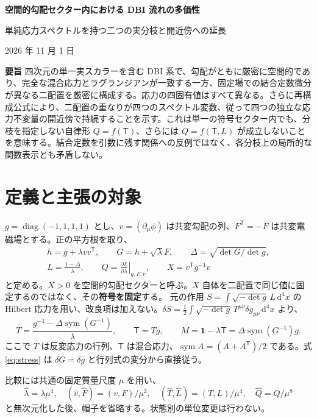 \documentclass[11pt,a4paper]{article}
\newcommand{\sym}{\operatorname{sym}}
\newcommand{\diag}{\operatorname{diag}}
\newcommand{\Id}{\mathbf 1}
\newcommand{\Tmix}{\mathsf T}
\newcommand{\dd}{\mathrm d}
\begin{document}
\begin{center}
{\Large\bfseries 空間的勾配セクター内における DBI 流れの多価性}\par
\vspace{5pt}
{\large 単純応力スペクトルを持つ二つの実分枝と開近傍への延長}\par
\vspace{5pt}
2026 年 11 月 1 日
\end{center}
\noindent\textbf{要旨}\quad
四次元の単一実スカラーを含む DBI 系で、勾配がともに厳密に空間的であり、完全な混合応力とラグランジアンが一致する一方、固定場での結合定数微分が異なる二配置を厳密に構成する。応力の四固有値はすべて異なる。さらに再構成公式により、二配置の重なりが四つのスペクトル変数、従って四つの独立な応力不変量の開近傍で持続することを示す。これは単一の符号セクター内でも、分枝を指定しない自律形 $Q=f(\Tmix)$、さらには $Q=f(\Tmix,L)$ が成立しないことを意味する。結合定数を引数に残す関係への反例ではなく、各分枝上の局所的な関数表示とも矛盾しない。

\section{定義と主張の対象}
$g=\diag(-1,1,1,1)$ とし、$v=(\partial_\mu\phi)$ は共変勾配の列、$F^{\mathsf T}=-F$ は共変電磁場とする。正の平方根を取り、
\begin{equation}\label{eq:def}
\begin{gathered}
h=g+\lambda vv^{\mathsf T},\qquad G=h+\sqrt\lambda F,\qquad
\Delta=\sqrt{\det G/\det g},\\
L=\frac{1-\Delta}{\lambda},\qquad
Q=\left.\frac{\partial L}{\partial\lambda}\right|_{g,F,v},\qquad
X=v^{\mathsf T}g^{-1}v
\end{gathered}
\end{equation}
と定める。$X>0$ を空間的勾配セクターと呼ぶ。$X$ 自体を二配置で同じ値に固定するのではなく、その\textbf{符号を固定}する。
元の作用 $S=\int\sqrt{-\det g}\,L\,\dd^4x$ の Hilbert 応力を用い、改良項は加えない。$\delta S=\frac12\int\sqrt{-\det g}\,T^{\mu\nu}\delta g_{\mu\nu}\,\dd^4x$ より、
\begin{equation}\label{eq:stress}
T=\frac{g^{-1}-\Delta\sym(G^{-1})}{\lambda},\qquad
\Tmix=Tg,\qquad M=\Id-\lambda\Tmix=\Delta\sym(G^{-1})g .
\end{equation}
ここで $T$ は反変応力の行列、$\Tmix$ は混合応力、$\sym A=(A+A^{\mathsf T})/2$ である。式 \eqref{eq:stress} は $\delta G=\delta g$ と行列式の変分から直接従う。

比較には共通の固定質量尺度 $\mu$ を用い、
\begin{equation}\label{eq:units}
\widehat\lambda=\lambda\mu^4,\quad
(\widehat v,\widehat F)=(v,F)/\mu^2,\quad
(\widehat T,\widehat L)=(T,L)/\mu^4,\quad
\widehat Q=Q/\mu^8
\end{equation}
と無次元化した後、帽子を省略する。状態別の単位変更は行わない。
\end{document}
